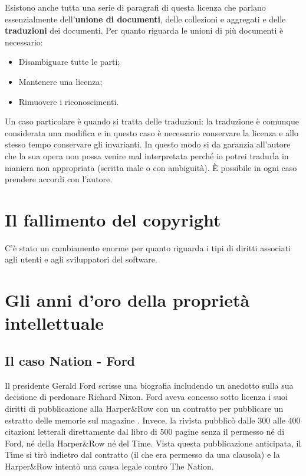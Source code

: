 Esistono anche tutta una serie di paragrafi di questa licenza che parlano essenzialmente dell'\textbf{unione di documenti}, delle collezioni e aggregati e delle \textbf{traduzioni} dei documenti. Per quanto riguarda le unioni di più documenti è necessario:

\begin{itemize}

\item Disambiguare tutte le parti;
\item Mantenere una licenza;
\item Rimuovere i riconoscimenti.

\end{itemize}

Un caso particolare è quando si tratta delle traduzioni: la traduzione è comunque considerata una modifica e in questo caso è necessario conservare la licenza e allo stesso tempo conservare gli invarianti. In questo modo si da garanzia all'autore che la sua opera non possa venire mal interpretata perché io potrei tradurla in maniera non appropriata (scritta male o con ambiguità). È possibile in ogni caso prendere accordi con l'autore.

\section{Il fallimento del copyright}

C'è stato un cambiamento enorme per quanto riguarda i tipi di diritti associati agli utenti e agli sviluppatori del software. 

\section{Gli anni d'oro della proprietà intellettuale}
\subsection{Il caso Nation - Ford}

Il presidente Gerald Ford scrisse una biografia includendo un anedotto sulla sua decisione di perdonare Richard Nixon. 
Ford aveva concesso sotto licenza i suoi diritti di pubblicazione alla Harper\&Row con un contratto per pubblicare un estratto delle memorie sul magazine . 
Invece, la rivista  pubblicò dalle 300 alle 400 citazioni letterali direttamente dal libro di 500 pagine senza il permesso né di Ford, né della Harper\&Row né del Time.
Vista questa pubblicazione anticipata, il Time si tirò indietro dal contratto (il che era permesso da una clausola) e la Harper\&Row intentò una causa legale contro The Nation.\\

